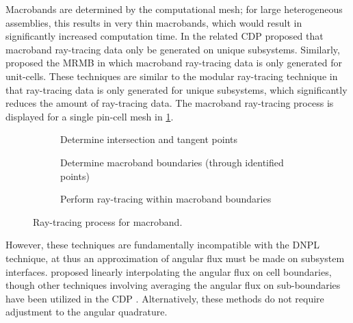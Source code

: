 {{        Macrobands are determined by the computational mesh; for large heterogeneous assemblies, this results in very thin macrobands, which would result in significantly increased computation time.
        In the related \ac{CDP} \citet{Hong1999} proposed that macroband ray-tracing data only be generated on unique subsystems.
        Similarly, \citet{Yamamoto2005} proposed the \ac{MRMB} in which macroband ray-tracing data is only generated for unit-cells.
        These techniques are similar to the modular ray-tracing technique in that ray-tracing data is only generated for unique subsystems, which significantly reduces the amount of ray-tracing data.
        The macroband ray-tracing process is displayed for a single pin-cell mesh in \cref{fig:RT:Macroband Process}.

       \begin{figure}[!ht]
            \centering
            \begin{subfigure}[t]{0.33\linewidth}
                \centering
                \def\svgwidth{0.95\linewidth}
                
                \caption{Determine intersection and tangent points}
            \end{subfigure}%
            \hfill
            \begin{subfigure}[t]{0.33\linewidth}
                \centering
                \def\svgwidth{0.95\linewidth}
                
                \caption{Determine macroband boundaries (through identified points)}
            \end{subfigure}%
            \hfill
            \begin{subfigure}[t]{0.33\linewidth}
                \centering
                \def\svgwidth{0.95\linewidth}
                
                \caption{Perform ray-tracing within macroband boundaries}
            \end{subfigure}
            \caption{Ray-tracing process for macroband.}
            \label{fig:RT:Macroband Process}
        \end{figure}

        However, these techniques are fundamentally incompatible with the \ac{DNPL} technique, at thus an approximation of angular flux must be made on subsystem interfaces.
        \citet{Yamamoto2005} proposed linearly interpolating the angular flux on cell boundaries, though other techniques involving averaging the angular flux on sub-boundaries have been utilized in the \ac{CDP} \cite{Liu2014}.
        Alternatively, these methods do not require adjustment to the angular quadrature.

}}
